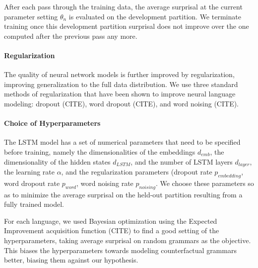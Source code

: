 \documentclass[11pt,letterpaper]{article}
\begin{document}
After each pass through the training data, the average surprisal at the current parameter setting $\theta_n$ is evaluated on the development partition.
We terminate training once this development partition surprisal does not improve over the one computed after the previous pass any more.

\paragraph{Regularization}
The quality of neural network models is further improved by regularization, improving generalization to the full data distribution.
We use three standard methods of regularization that have been shown to improve neural language modeling: dropout (CITE), word dropout (CITE), and word noising (CITE).

\paragraph{Choice of Hyperparameters}

The LSTM model has a set of numerical parameters that need to be specified before training, namely the dimensionalities of the embeddings $d_{emb}$, the dimensionality of the hidden states $d_{LSTM}$, and the number of LSTM layers $d_{layer}$, the learning rate $\alpha$, and the regularization parameters (dropout rate $p_{embedding}$, word dropout rate $p_{word}$, word noising rate $p_{noising}$.
We choose these parameters so as to minimize the average surprisal on the held-out partition resulting from a fully trained model.

For each language, we used Bayesian optimization using the Expected Improvement acquisition function (CITE) \citep{snoek-practical-2012} to find a good setting of the hyperparameters, taking average surprisal on random grammars as the objective.
This biases the hyperparameters towards modeling counterfactual grammars better, biasing them against our hypothesis.
\end{document}
